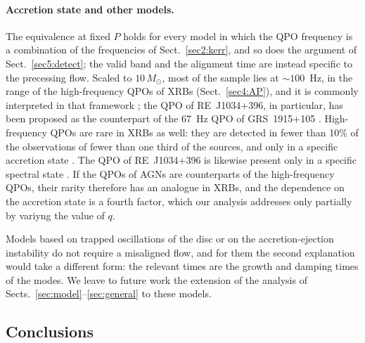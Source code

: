 \paragraph{Accretion state and other models.}
The equivalence at fixed $P$ holds for every model in which the QPO frequency is a combination of the frequencies of Sect.~\ref{sec2:kerr}, and so does the argument of Sect.~\ref{sec5:detect}; the valid band and the alignment time are instead specific to the precessing flow.
Scaled to $10\,M_\odot$, most of the sample lies at $\sim100$~Hz, in the range of the high-frequency QPOs of XRBs (Sect.~\ref{sec4:AP}), and it is commonly interpreted in that framework \citep{Smith2021,Zhang2025}; the QPO of RE~J1034+396, in particular, has been proposed as the counterpart of the 67~Hz QPO of GRS~1915+105 \citep{Jin2020}.
High-frequency QPOs are rare in XRBs as well: they are detected in fewer than 10\% of the observations of fewer than one third of the sources, and only in a specific accretion state \citep{VaughanUttley2005}.
The QPO of RE~J1034+396 is likewise present only in a specific spectral state \citep{Jin2020}.
If the QPOs of AGNs are counterparts of the high-frequency QPOs, their rarity therefore has an analogue in XRBs, and the dependence on the accretion state is a fourth factor, which our analysis addresses only partially by variyng the value of $q$.

Models based on trapped oscillations of the disc \citep{wagoner,kato} or on the accretion-ejection instability \citep{AEI,AEI_SMBH} do not require a misaligned flow, and for them the second explanation would take a different form: the relevant times are the growth and damping times of the modes.
We leave to future work the extension of the analysis of Sects.~\ref{sec:model}--\ref{sec:general} to these models.

\subsection{Conclusions}
\label{sec5:conclusions}

